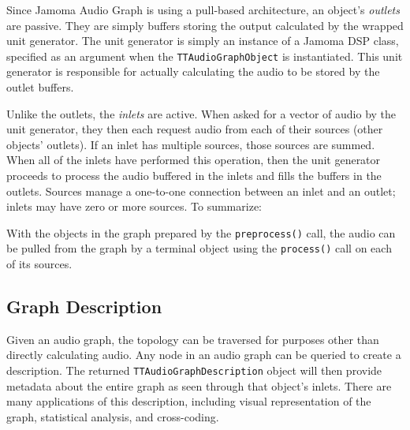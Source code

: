\documentclass[twoside,a4paper]{article}
\begin{document}
Since Jamoma Audio Graph is using a pull-based architecture, an object's \emph{outlets} are passive.  
They are simply buffers storing the output calculated by the wrapped unit generator.  
The unit generator is simply an instance of a Jamoma DSP class, specified as an argument when the \texttt{TTAudioGraphObject} is instantiated. 
This unit generator is responsible for actually calculating the audio to be stored by the outlet buffers.

Unlike the outlets, the \emph{inlets} are active.  
When asked for a vector of audio by the unit generator, they then each request audio from each of their sources (other objects' outlets).  
If an inlet has multiple sources, those sources are summed.  
When all of the inlets have performed this operation, then the unit generator proceeds to process the audio buffered in the inlets and fills the buffers in the outlets.  
Sources manage a one-to-one connection between an inlet and an outlet; inlets may have zero or more sources.  
To summarize:

With the objects in the graph prepared by the \texttt{preprocess()} call, the audio can be pulled from the graph by a terminal object using the \texttt{process()} call on each of its sources.





\subsection{Graph Description} %

Given an audio graph, the topology can be traversed for purposes other than directly calculating audio.  
Any node in an audio graph can be queried to create a description.  The returned \texttt{TTAudioGraphDescription} object will then provide metadata about the entire graph as seen through that object's inlets.  
There are many applications of this description, including visual representation of the graph, statistical analysis, and cross-coding.
\end{document}

